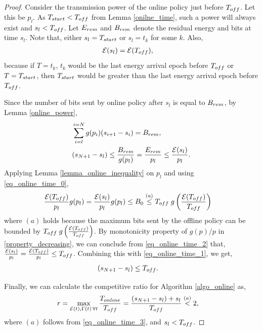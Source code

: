 \begin{proof}
Consider the transmission power of the online policy just before $T_{\mbox{\scriptsize{off}}}$. Let this be ${p}_l$. As $T_{\mbox{\scriptsize{start}}}<T_{\mbox{\scriptsize{off}}}$ from Lemma \ref{onilne_time}, such a power will always exist and $s_l<T_{\mbox{\scriptsize{off}}}$. Let $E_{\mbox{\scriptsize{rem}}}$ and $B_{\mbox{\scriptsize{rem}}}$ denote the residual energy and bits at time ${s}_{l}$. Note that, either ${s}_{l}=T_{\mbox{\scriptsize{start}}}$ or ${s}_{l}=t_k$ for some $k$. Also, 
\begin{align}
&\ETx({s}_{l})=\ETx(T_{\mbox{\scriptsize{off}}}),
\label{eq_online_time_0}
\end{align}
because if $T=t_k$, $t_k$ would be the last energy arrival epoch before $T_{\mbox{\scriptsize{off}}}$ or $T=T_{\mbox{\scriptsize{start}}}$, then $T_{\mbox{\scriptsize{start}}}$ would be greater than the last energy arrival epoch before $T_{\mbox{\scriptsize{off}}}$. 

Since the number of bits sent by online policy after ${s}_l$ is equal to $B_{\mbox{\scriptsize{rem}}}$, by Lemma \ref{online_power},
\begin{align}
&\sum_{i=l}^{i={N}}g(p_i)({s}_{i+1}-{s}_i)=B_{\mbox{\scriptsize{rem}}},
\\
&({s}_{{N}+1}-{s}_l)\le\frac{B_{\mbox{\scriptsize{rem}}}}{g(p_l)}=\frac{E_{\mbox{\scriptsize{rem}}}}{p_l}\le \frac{\ETx({s}_l)}{p_l}.
\label{eq_online_time_1}  
\end{align}
Applying Lemma \ref{lemma_online_inequality} on $p_l$ and using \eqref{eq_online_time_0},
\begin{align}
&\frac{\ETx(T_{\mbox{\scriptsize{off}}})}{p_l}g(p_l)=\frac{\ETx({s}_l)}{p_l}g(p_l)\le B_0\stackrel{(a)}{\le}T_{\mbox{\scriptsize{off}}}\; g\left(\frac{\ETx(T_{\mbox{\scriptsize{off}}})}{T_{\mbox{\scriptsize{off}}}}\right)
\label{eq_online_time_2}
\end{align}
where $(a)$ holds because the maximum bits sent by the offline policy can be bounded by $T_{\mbox{\scriptsize{off}}}\; g\left(\frac{\ETx(T_{\mbox{\scriptsize{off}}})}{T_{\mbox{\scriptsize{off}}}}\right)$. By monotonicity property of $g(p)/p$ in \eqref{property_decreasing}, we can conclude from \eqref{eq_online_time_2} that, $\frac{\ETx({s}_l)}{p_l}=\frac{\ETx(T_{\mbox{\scriptsize{off}}})}{p_l}\le T_{\mbox{\scriptsize{off}}}$. Combining this with \eqref{eq_online_time_1}, we get,
\begin{align}
&({s}_{{N}+1}-{s}_l)\le T_{\mbox{\scriptsize{off}}}.
\label{eq_online_time_3}
\end{align} 

Finally, we can calculate the competitive ratio for Algorithm \ref{algo_online} as,
\begin{align*}
&r=\displaystyle\max_{\ETx(t),\TRx(t)\hspace{0.5mm} \forall t}\dfrac{T_{\mbox{\scriptsize{online}}}}{T_{\mbox{\scriptsize{off}}}} = \dfrac{({s}_{{N}+1}-{s}_l)+{s}_l}{T_{\mbox{\scriptsize{off}}}} \stackrel{(a)}{<} 2,
\end{align*}
where $(a)$ follows from \eqref{eq_online_time_3}, and ${s}_l<T_{\mbox{\scriptsize{off}}}$.        
\end{proof}

